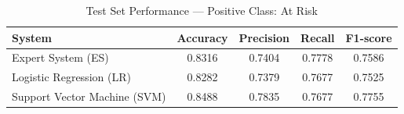 \begin{table}[H]
\centering
\caption{Test Set Performance --- Positive Class: At Risk}
\label{tab:model-performance}
\begin{tabular}{lcccc}
\toprule
System & Accuracy & Precision & Recall & F1-score \\
\midrule
Expert System (ES) & 0.8316 & 0.7404 & 0.7778 & 0.7586 \\
Logistic Regression (LR) & 0.8282 & 0.7379 & 0.7677 & 0.7525 \\
Support Vector Machine (SVM) & 0.8488 & 0.7835 & 0.7677 & 0.7755 \\
\bottomrule
\end{tabular}
\end{table}
